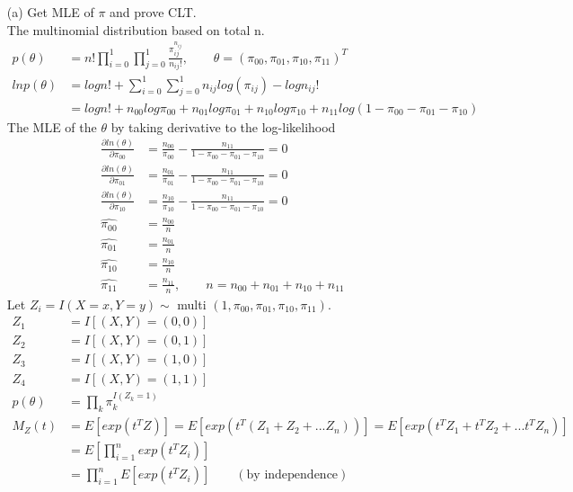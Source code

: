 \documentclass[11pt]{article} %
\begin{document}
\begin{itemize}
	\item [(a)] Get MLE of $\pi$ and prove CLT.\\
	The multinomial distribution based on total n. 
	\begin{align*}
		p(\theta) &=n! \prod_{i=0}^1 \prod_{j=0}^1  \frac{\pi_{ij}^{n_{ij}}}{n_{ij}!}, \qquad \theta = (\pi_{00}, \pi_{01}, \pi_{10}, \pi_{11})^T\\
		ln p(\theta) &=log n!+ \sum_{i=0}^1 \sum_{j=0}^1 n_{ij}log( \pi_{ij}) - log n_{ij}! \\
		&= log n!+ n_{00}log \pi_{00}  + n_{01}log \pi_{01}  + n_{10}log \pi_{10}  + n_{11}log (1-\pi_{00}-\pi_{01} - \pi_{10})  
	\end{align*}
	The MLE of the $\theta$ by taking derivative to the log-likelihood
	\begin{align*}
		\frac{\partial ln(\theta)}{\partial \pi_{00}} &= \frac{n_{00}}{\pi_{00}} - \frac{n_{11}}{1-\pi_{00}-\pi_{01}-\pi_{10}} = 0\\  
		\frac{\partial ln(\theta)}{\partial \pi_{01}} &=\frac{n_{01}}{\pi_{01}} - \frac{n_{11}}{1-\pi_{00}-\pi_{01}-\pi_{10}} = 0 \\  
		\frac{\partial ln(\theta)}{\partial \pi_{10}} &= \frac{n_{10}}{\pi_{10}} - \frac{n_{11}}{1-\pi_{00}-\pi_{01}-\pi_{10}} = 0\\ 
		\hat{\pi_{00}} & = \frac{n_{00}}{n}\\
		\hat{\pi_{01}} & = \frac{n_{01}}{n}\\
		\hat{\pi_{10}} & = \frac{n_{10}}{n}\\
		\hat{\pi_{11}} & = \frac{n_{11}}{n}, \qquad n= n_{00} + n_{01} + n_{10} + n_{11}
	\end{align*}
	Let $Z_i= I(X=x, Y=y) \sim $ multi $(1, \pi_{00}, \pi_{01}, \pi_{10}, \pi_{11})$.
	\begin{align*}
		Z_1 &= I[(X,Y)= (0,0)]\\
		Z_2 &= I[(X,Y)= (0,1)]\\
		Z_3 &= I[(X,Y)= (1,0)]\\
		Z_4 &= I[(X,Y)= (1,1)]\\
		p(\theta) &= \prod_k \pi_{k}^{I(Z_k=1)}\\
		M_Z(t) &= E[exp(t^TZ)] = E[exp(t^T(Z_1 + Z_2 +... Z_n))] = E[exp(t^TZ_1 + t^TZ_2 + ... t^TZ_n)]\\
		&= E[\prod_{i=1}^n exp(t^TZ_i)]\\
		&= \prod_{i=1}^n E[exp(t^TZ_i)]  \qquad (\text{by independence})\\

\end{align*}
\end{itemize}
\end{document}
